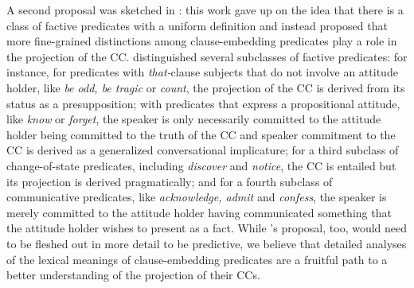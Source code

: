 \documentclass[11pt,fleqn]{article}
\newcommand{\6}{\mbox{$[\hspace*{-.6mm}[$}}
\newcommand{\9}{\mbox{$]\hspace*{-.6mm}]$}}
\newcommand{\citepos}[1]{\citeauthor{#1}'s \citeyear{#1}}
\newcommand{\citetpos}[1]{\citeauthor{#1}'s (\citeyear{#1})}
\begin{document}
{A second proposal was sketched in \citealt{karttunen2016}: this work gave up on the idea that there is a class of factive predicates with a uniform definition and instead proposed that more fine-grained distinctions among clause-embedding predicates play a role in the projection of the CC. \citet{karttunen2016} distinguished several subclasses of factive predicates: for instance, for predicates with {\em that-}clause subjects that do not involve an attitude holder, like {\em be odd, be tragic} or {\em count}, the projection of the CC is derived from its status as a presupposition; with predicates that express a propositional attitude, like {\em know} or {\em forget}, the speaker is only necessarily committed to the attitude holder being committed to the truth of the CC and speaker commitment to the CC is derived as a generalized conversational implicature; for a third subclass of change-of-state predicates, including {\em discover} and {\em notice}, the CC is entailed but its projection is derived pragmatically; and for a fourth subclass of communicative predicates, like {\em acknowledge, admit} and {\em confess}, the speaker is merely committed to the attitude holder having communicated something that the attitude holder wishes to present as a fact. While \citepos{karttunen2016} proposal, too, would need to be fleshed out in more detail to be predictive, we believe that detailed analyses of the lexical meanings of clause-embedding predicates are a fruitful path to a better understanding of the projection of their CCs.




}
\end{document}
